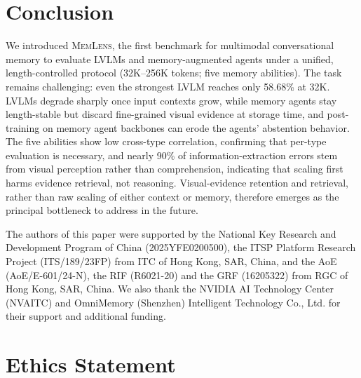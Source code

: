 \documentclass{llmxive}
\providecommand{\bench}{\textsc{MemLens}}
\begin{document}
\section{Conclusion}
\label{sec:conclusion}

We introduced \bench{}, the first benchmark for multimodal conversational memory to evaluate LVLMs and memory-augmented agents under a unified, length-controlled protocol (32K–256K tokens; five memory abilities). The task remains challenging: even the strongest LVLM reaches only 58.68\% at 32K. LVLMs degrade sharply once input contexts grow, while memory agents stay length-stable but discard fine-grained visual evidence at storage time, and post-training on memory agent backbones can erode the agents' abstention behavior. The five abilities show low cross-type correlation, confirming that per-type evaluation is necessary, and nearly 90\% of information-extraction errors stem from visual perception rather than comprehension, indicating that scaling first harms evidence retrieval, not reasoning. Visual-evidence retention and retrieval, rather than raw scaling of either context or memory, therefore emerges as the principal bottleneck to address in the future.



\begin{ack}
The authors of this paper were supported by the National Key Research and Development Program of China (2025YFE0200500), the ITSP Platform Research Project (ITS/189/23FP) from ITC of Hong Kong, SAR, China, and the AoE (AoE/E-601/24-N), the RIF (R6021-20) and the GRF (16205322) from RGC of Hong Kong, SAR, China. We also thank the NVIDIA AI Technology Center (NVAITC) and OmniMemory (Shenzhen) Intelligent Technology Co., Ltd. for their support and additional funding.
\end{ack}

\section*{Ethics Statement}
\end{document}
